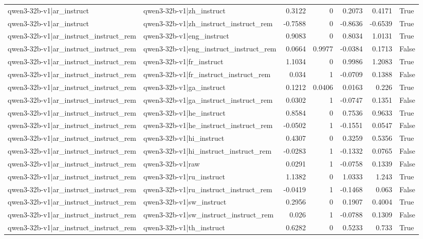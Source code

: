 \begin{table}
\begin{tabular}{l l r r r r l}
qwen3-32b-v1|ar_instruct & qwen3-32b-v1|zh_instruct & 0.3122 & 0 & 0.2073 & 0.4171 & True \\
qwen3-32b-v1|ar_instruct & qwen3-32b-v1|zh_instruct_instruct_rem & -0.7588 & 0 & -0.8636 & -0.6539 & True \\
qwen3-32b-v1|ar_instruct_instruct_rem & qwen3-32b-v1|eng_instruct & 0.9083 & 0 & 0.8034 & 1.0131 & True \\
qwen3-32b-v1|ar_instruct_instruct_rem & qwen3-32b-v1|eng_instruct_instruct_rem & 0.0664 & 0.9977 & -0.0384 & 0.1713 & False \\
qwen3-32b-v1|ar_instruct_instruct_rem & qwen3-32b-v1|fr_instruct & 1.1034 & 0 & 0.9986 & 1.2083 & True \\
qwen3-32b-v1|ar_instruct_instruct_rem & qwen3-32b-v1|fr_instruct_instruct_rem & 0.034 & 1 & -0.0709 & 0.1388 & False \\
qwen3-32b-v1|ar_instruct_instruct_rem & qwen3-32b-v1|ga_instruct & 0.1212 & 0.0406 & 0.0163 & 0.226 & True \\
qwen3-32b-v1|ar_instruct_instruct_rem & qwen3-32b-v1|ga_instruct_instruct_rem & 0.0302 & 1 & -0.0747 & 0.1351 & False \\
qwen3-32b-v1|ar_instruct_instruct_rem & qwen3-32b-v1|he_instruct & 0.8584 & 0 & 0.7536 & 0.9633 & True \\
qwen3-32b-v1|ar_instruct_instruct_rem & qwen3-32b-v1|he_instruct_instruct_rem & -0.0502 & 1 & -0.1551 & 0.0547 & False \\
qwen3-32b-v1|ar_instruct_instruct_rem & qwen3-32b-v1|hi_instruct & 0.4307 & 0 & 0.3259 & 0.5356 & True \\
qwen3-32b-v1|ar_instruct_instruct_rem & qwen3-32b-v1|hi_instruct_instruct_rem & -0.0283 & 1 & -0.1332 & 0.0765 & False \\
qwen3-32b-v1|ar_instruct_instruct_rem & qwen3-32b-v1|raw & 0.0291 & 1 & -0.0758 & 0.1339 & False \\
qwen3-32b-v1|ar_instruct_instruct_rem & qwen3-32b-v1|ru_instruct & 1.1382 & 0 & 1.0333 & 1.243 & True \\
qwen3-32b-v1|ar_instruct_instruct_rem & qwen3-32b-v1|ru_instruct_instruct_rem & -0.0419 & 1 & -0.1468 & 0.063 & False \\
qwen3-32b-v1|ar_instruct_instruct_rem & qwen3-32b-v1|sw_instruct & 0.2956 & 0 & 0.1907 & 0.4004 & True \\
qwen3-32b-v1|ar_instruct_instruct_rem & qwen3-32b-v1|sw_instruct_instruct_rem & 0.026 & 1 & -0.0788 & 0.1309 & False \\
qwen3-32b-v1|ar_instruct_instruct_rem & qwen3-32b-v1|th_instruct & 0.6282 & 0 & 0.5233 & 0.733 & True \\

\end{tabular}
\end{table}
